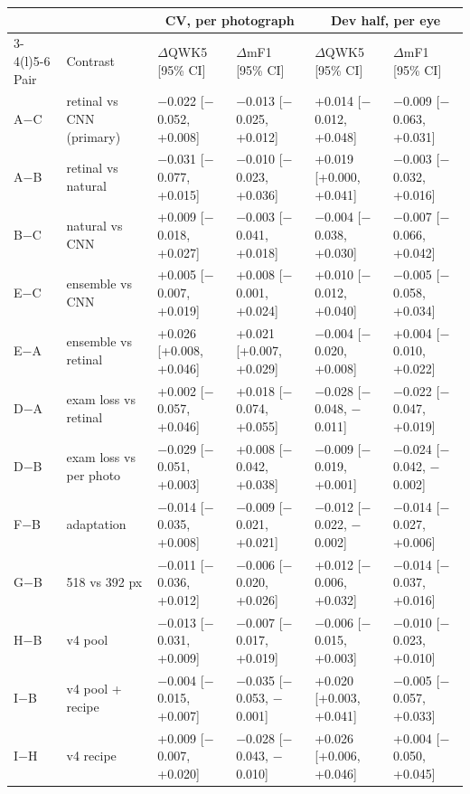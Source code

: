 \begin{tabular}{@{}llllll@{}}
\toprule
 & & \multicolumn{2}{c}{CV, per photograph} & \multicolumn{2}{c}{Dev half, per eye}\\
\cmidrule(lr){3-4}\cmidrule(l){5-6}
Pair & Contrast & $\Delta$QWK5 [95\% CI] & $\Delta$mF1 [95\% CI] & $\Delta$QWK5 [95\% CI] & $\Delta$mF1 [95\% CI]\\
\midrule
A$-$C & retinal vs CNN (primary) & $-$0.022 [$-$0.052, +0.008] & $-$0.013 [$-$0.025, +0.012] & +0.014 [$-$0.012, +0.048] & $-$0.009 [$-$0.063, +0.031] \\
A$-$B & retinal vs natural & $-$0.031 [$-$0.077, +0.015] & $-$0.010 [$-$0.023, +0.036] & +0.019 [+0.000, +0.041] & $-$0.003 [$-$0.032, +0.016] \\
B$-$C & natural vs CNN & +0.009 [$-$0.018, +0.027] & $-$0.003 [$-$0.041, +0.018] & $-$0.004 [$-$0.038, +0.030] & $-$0.007 [$-$0.066, +0.042] \\
E$-$C & ensemble vs CNN & +0.005 [$-$0.007, +0.019] & +0.008 [$-$0.001, +0.024] & +0.010 [$-$0.012, +0.040] & $-$0.005 [$-$0.058, +0.034] \\
E$-$A & ensemble vs retinal & +0.026 [+0.008, +0.046] & +0.021 [+0.007, +0.029] & $-$0.004 [$-$0.020, +0.008] & +0.004 [$-$0.010, +0.022] \\
D$-$A & exam loss vs retinal & +0.002 [$-$0.057, +0.046] & +0.018 [$-$0.074, +0.055] & $-$0.028 [$-$0.048, $-$0.011] & $-$0.022 [$-$0.047, +0.019] \\
D$-$B & exam loss vs per photo & $-$0.029 [$-$0.051, +0.003] & +0.008 [$-$0.042, +0.038] & $-$0.009 [$-$0.019, +0.001] & $-$0.024 [$-$0.042, $-$0.002] \\
F$-$B & adaptation & $-$0.014 [$-$0.035, +0.008] & $-$0.009 [$-$0.021, +0.021] & $-$0.012 [$-$0.022, $-$0.002] & $-$0.014 [$-$0.027, +0.006] \\
G$-$B & 518 vs 392 px & $-$0.011 [$-$0.036, +0.012] & $-$0.006 [$-$0.020, +0.026] & +0.012 [$-$0.006, +0.032] & $-$0.014 [$-$0.037, +0.016] \\
H$-$B & v4 pool & $-$0.013 [$-$0.031, +0.009] & $-$0.007 [$-$0.017, +0.019] & $-$0.006 [$-$0.015, +0.003] & $-$0.010 [$-$0.023, +0.010] \\
I$-$B & v4 pool + recipe & $-$0.004 [$-$0.015, +0.007] & $-$0.035 [$-$0.053, $-$0.001] & +0.020 [+0.003, +0.041] & $-$0.005 [$-$0.057, +0.033] \\
I$-$H & v4 recipe & +0.009 [$-$0.007, +0.020] & $-$0.028 [$-$0.043, $-$0.010] & +0.026 [+0.006, +0.046] & +0.004 [$-$0.050, +0.045] \\
\bottomrule
\end{tabular}
